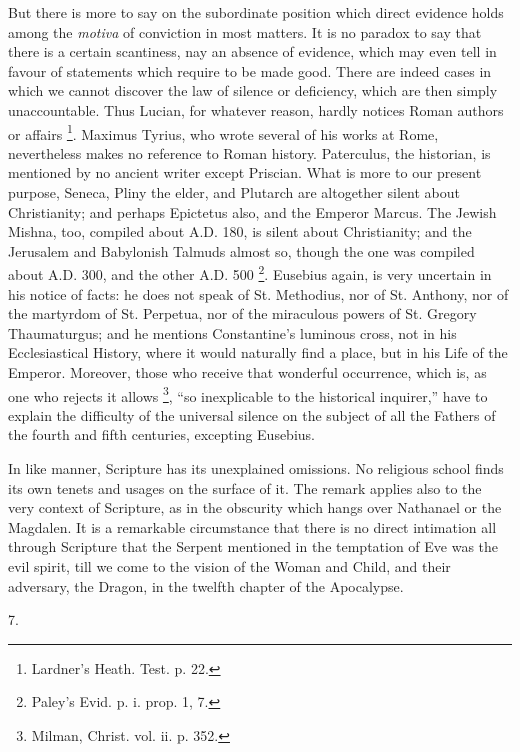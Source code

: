 But there is more to say on the subordinate position
which direct evidence holds among the \emph{motiva} of
conviction in most matters. It is no paradox to say that
there is a certain scantiness, nay an absence of
evidence, which may even tell in favour of statements
which require to be made good. There are indeed cases in
which we cannot discover the law of silence or
deficiency, which are then simply unaccountable. Thus
Lucian, for whatever reason, hardly notices Roman authors
or affairs \footnote{Lardner's Heath. Test. p. 22.}. Maximus Tyrius, who wrote several of his works at
Rome, nevertheless makes no reference to Roman history.
Paterculus, the historian, is mentioned by no ancient
writer except Priscian. What is more to our present
purpose, Seneca, Pliny the elder, and Plutarch are
altogether silent about Christianity; and perhaps
Epictetus also, and the Emperor Marcus. The Jewish
Mishna, too, compiled about A.D. 180, is silent about
Christianity; and the Jerusalem and Babylonish Talmuds
almost so, though the one was compiled about A.D. 300,
and the other A.D. 500 \footnote{Paley's Evid. p. i. prop. 1, 7.}. Eusebius again, is very
uncertain in his notice of facts: he does not speak of
St. Methodius, nor of St. Anthony, nor of the martyrdom
of St. Perpetua, nor of the miraculous powers of St.
Gregory Thaumaturgus; and he mentions Constantine's
luminous cross, not in his Ecclesiastical History, where
it would naturally find a place, but in his Life of the
Emperor. Moreover, those who receive that wonderful
occurrence, which is, as one who rejects it allows \footnote{Milman, Christ. vol. ii. p.
352.},
``so inexplicable to the historical inquirer,''
have to explain the difficulty of the universal silence
on the subject of all the Fathers of the fourth and fifth
centuries, excepting Eusebius.

In like manner, Scripture has its unexplained
omissions. No religious school finds its own tenets and
usages on the surface of it. The remark applies also to
the very context of Scripture, as in the obscurity which
hangs over Nathanael or the Magdalen. It is a remarkable
circumstance that there is no direct intimation all
through Scripture that the Serpent mentioned in the
temptation of Eve was the evil spirit, till we come to
the vision of the Woman and Child, and their adversary,
the Dragon, in the twelfth chapter of the Apocalypse.

7.

